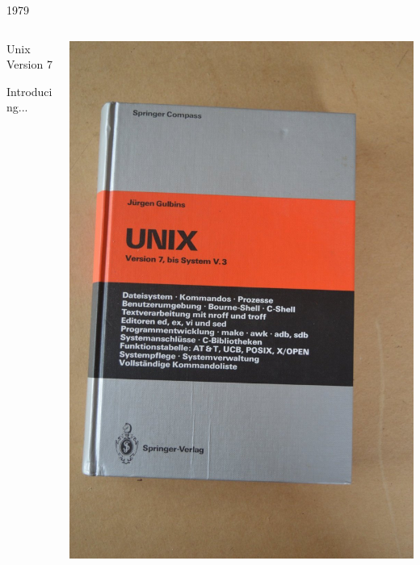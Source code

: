 \documentclass{slide}
\begin{document}
\begin{frame}{1979}
    \vspace{-3em}
    \begin{columns}
    \begin{column}{0.5\textwidth}
    {\color{primary}\Large Unix Version 7}
    \vspace{1em}

    \large Introducing... 
    \end{column}
    \begin{column}{0.5\textwidth}
    \begin{center}
    \includegraphics[height=0.95\textheight]{images/unix7}
    \end{center}
    \end{column}
    \end{columns}
\end{frame}
\end{document}
